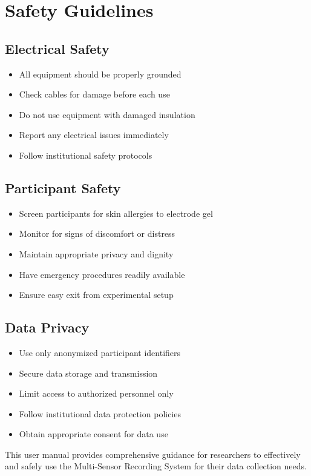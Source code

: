 \section{Safety Guidelines}

\subsection{Electrical Safety}

\begin{itemize}
\item All equipment should be properly grounded
\item Check cables for damage before each use
\item Do not use equipment with damaged insulation
\item Report any electrical issues immediately
\item Follow institutional safety protocols
\end{itemize}

\subsection{Participant Safety}

\begin{itemize}
\item Screen participants for skin allergies to electrode gel
\item Monitor for signs of discomfort or distress
\item Maintain appropriate privacy and dignity
\item Have emergency procedures readily available
\item Ensure easy exit from experimental setup
\end{itemize}

\subsection{Data Privacy}

\begin{itemize}
\item Use only anonymized participant identifiers
\item Secure data storage and transmission
\item Limit access to authorized personnel only
\item Follow institutional data protection policies
\item Obtain appropriate consent for data use
\end{itemize}

This user manual provides comprehensive guidance for researchers to effectively and safely use the Multi-Sensor Recording System for their data collection needs.
